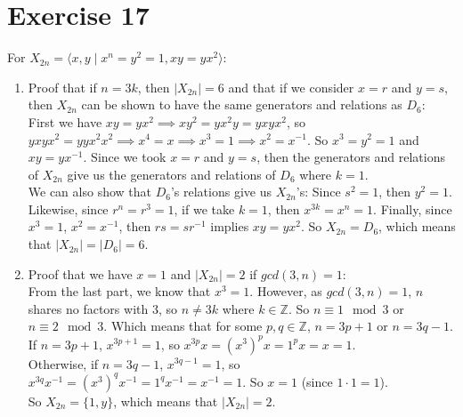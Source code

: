 \documentclass{article}
\newcommand{\Z}{\mathbb{Z}}
\begin{document}
    \section*{Exercise 17}
    For $X_{2n} = \langle x, y \mid x^n = y^2 = 1, xy = yx^2 \rangle$: \\
    \begin{enumerate}[label=\textbf{\alph*.}]
        \item 
            Proof that if $n = 3k$, then $|X_{2n}| = 6$
            and that if we consider $x = r$ and $y = s$,
            then $X_{2n}$ can be shown to have the same generators and 
            relations as $D_6$: \\
            First we have $xy = yx^2
            \implies xy^2 = yx^2y = yxyx^2$,
            so $yxyx^2 = yyx^2x^2 \implies
            x^4 = x
            \implies x^3 = 1
            \implies x^2 = x^{-1}$.
            So $x^3 = y^2 = 1$ and $xy = yx^{-1}$.
            Since we took $x = r$ and $y = s$,
            then the generators and relations of $X_{2n}$ give us the
            generators and relations of $D_6$ where $k = 1$. \\
            We can also show that $D_6$'s relations give us $X_{2n}$'s:
            Since $s^2 = 1$, then $y^2 = 1$.
            Likewise, since $r^n = r^3 = 1$,
            if we take $k = 1$,
            then $x^{3k} = x^n = 1$.
            Finally, since $x^3 = 1$, $x^2 = x^{-1}$,
            then $rs = sr^{-1}$ implies $xy = yx^{2}$.
            So $X_{2n} = D_6$,
            which means that $|X_{2n}| = |D_6| = 6$.
        \item 
            Proof that we have $x = 1$ and $|X_{2n}| = 2$
            if $gcd(3, n) = 1$: \\
            From the last part, we know that $x^3 = 1$.
            However, as $gcd(3, n) = 1$, $n$ shares no factors with 3,
            so $n \neq 3k$ where $k \in \Z$.
            So $n \equiv 1 \mod 3$ or $n \equiv 2 \mod 3$. 
            Which means that for some $p, q \in \Z$,
            $n = 3p + 1$ or $n = 3q - 1$. \\
            If $n = 3p + 1$, $x^{3p + 1} = 1$,
            so $x^{3p}x = (x^3)^px = 1^px = x = 1$. \\
            Otherwise, if $n = 3q - 1$, $x^{3q - 1} = 1$,
            so $x^{3q}x^{-1} = (x^3)^qx^{-1} = 1^qx^{-1} = x^{-1} = 1$.
            So $x = 1$ (since $1 \cdot 1 = 1$). \\
            So $X_{2n} = \{1, y\}$,
            which means that $|X_{2n}| = 2$.
    \end{enumerate}   
\end{document}
